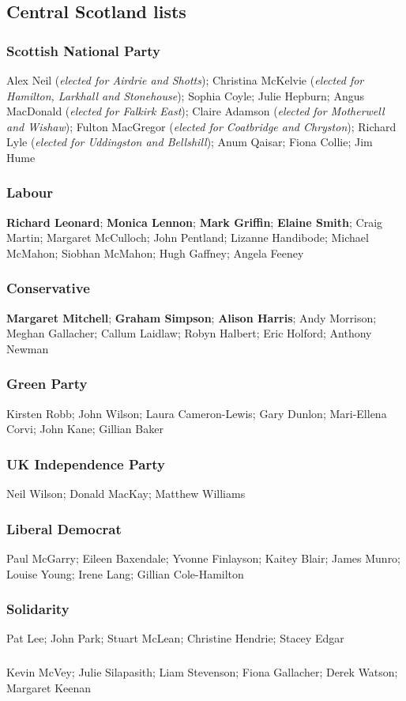 \subsection*{Central Scotland lists}

\begin{resultsiii}
\subsubsection*{Scottish National Party}
Alex Neil (\emph{elected for Airdrie and Shotts}); Christina McKelvie (\emph{elected for Hamilton, Larkhall and Stonehouse}); Sophia Coyle; Julie Hepburn; Angus MacDonald (\emph{elected for Falkirk East}); Claire Adamson (\emph{elected for Motherwell and Wishaw}); Fulton MacGregor (\emph{elected for Coatbridge and Chryston}); Richard Lyle (\emph{elected for Uddingston and Bellshill}); Anum Qaisar; Fiona Collie; Jim Hume
\subsubsection*{Labour}
\textbf{Richard Leonard}; \textbf{Monica Lennon}; \textbf{Mark Griffin}; \textbf{Elaine Smith}; Craig Martin; Margaret McCulloch; John Pentland; Lizanne Handibode; Michael McMahon; Siobhan McMahon; Hugh Gaffney; Angela Feeney
\subsubsection*{Conservative}
\textbf{Margaret Mitchell}; \textbf{Graham Simpson}; \textbf{Alison Harris}; Andy Morrison; Meghan Gallacher; Callum Laidlaw; Robyn Halbert; Eric Holford; Anthony Newman
\subsubsection*{Green Party}
Kirsten Robb; John Wilson; Laura Cameron-Lewis; Gary Dunlon; Mari-Ellena Corvi; John Kane; Gillian Baker
\subsubsection*{UK Independence Party}
Neil Wilson; Donald MacKay; Matthew Williams
\subsubsection*{Liberal Democrat}
Paul McGarry; Eileen Baxendale; Yvonne Finlayson; Kaitey Blair; James Munro; Louise Young; Irene Lang; Gillian Cole-Hamilton
\subsubsection*{Solidarity}
Pat Lee; John Park; Stuart McLean; Christine Hendrie; Stacey Edgar
\subsubsection*{\RISE}
Kevin McVey; Julie Silapasith; Liam Stevenson; Fiona Gallacher; Derek Watson; Margaret Keenan
\end{resultsiii}

